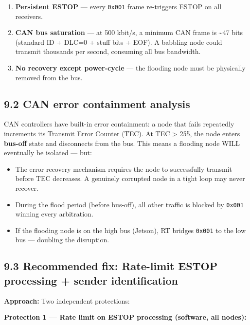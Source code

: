 \documentclass[12pt,a4paper,oneside]{report}
\providecommand{\tightlist}{\setlength{\itemsep}{0pt}\setlength{\parskip}{0pt}}
\begin{document}
\begin{enumerate}
\def\labelenumi{\arabic{enumi}.}
\tightlist
\item
  \textbf{Persistent ESTOP} --- every \texttt{0x001} frame re-triggers ESTOP on
  all receivers.
\item
  \textbf{CAN bus saturation} --- at 500 kbit/s, a minimum CAN frame is
  \textasciitilde47 bits (standard ID + DLC=0 + stuff bits + EOF). A babbling
  node could transmit thousands per second, consuming all bus bandwidth.
\item
  \textbf{No recovery except power-cycle} --- the flooding node must be
  physically removed from the bus.
\end{enumerate}

\subsection{9.2 CAN error containment
analysis}\label{can-error-containment-analysis}

CAN controllers have built-in error containment: a node that fails repeatedly
increments its Transmit Error Counter (TEC). At TEC \textgreater{} 255, the node
enters \textbf{bus-off} state and disconnects from the bus. This means a
flooding node WILL eventually be isolated --- but:

\begin{itemize}
\tightlist
\item
  The error recovery mechanism requires the node to successfully transmit before
  TEC decreases. A genuinely corrupted node in a tight loop may never recover.
\item
  During the flood period (before bus-off), all other traffic is blocked by
  \texttt{0x001} winning every arbitration.
\item
  If the flooding node is on the high bus (Jetson), RT bridges \texttt{0x001} to
  the low bus --- doubling the disruption.
\end{itemize}

\subsection{9.3 Recommended fix: Rate-limit ESTOP processing + sender
identification}\label{recommended-fix-rate-limit-estop-processing-sender-identification}

\textbf{Approach:} Two independent protections:

\textbf{Protection 1 --- Rate limit on ESTOP processing (software, all nodes):}
\end{document}
